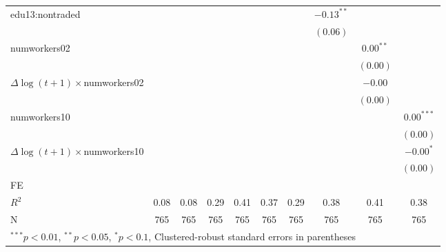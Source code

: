 \begin{tabular}{l c c c c c c c c c }
edu13:nontraded      &              &              &              &               &               &              & $-0.13^{**}$  &               &               \\
                     &              &              &              &               &               &              & $(0.06)$      &               &               \\
numworkers02         &              &              &              &               &               &              &               & $0.00^{**}$   &               \\
                     &              &              &              &               &               &              &               & $(0.00)$      &               \\
$\Delta \log(t+1) \times$numworkers02 &              &              &              &               &               &              &               & $-0.00$       &               \\
                     &              &              &              &               &               &              &               & $(0.00)$      &               \\
numworkers10         &              &              &              &               &               &              &               &               & $0.00^{***}$  \\
                     &              &              &              &               &               &              &               &               & $(0.00)$      \\
$\Delta \log(t+1) \times$numworkers10 &              &              &              &               &               &              &               &               & $-0.00^{*}$   \\
                     &              &              &              &               &               &              &               &               & $(0.00)$      \\
\hline
FE          &                &                &                &                &                &                &                &                &                \\ 
\hline
$R^2$                & 0.08         & 0.08         & 0.29         & 0.41          & 0.37          & 0.29         & 0.38          & 0.41          & 0.38          \\
N                    & 765          & 765          & 765          & 765           & 765           & 765          & 765           & 765           & 765           \\
\hline
\multicolumn{10}{l}{\scriptsize{$^{***}p<0.01$, $^{**}p<0.05$, $^*p<0.1$, Clustered-robust standard errors in parentheses}}
\end{tabular}
